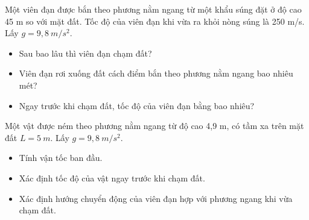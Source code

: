 \begin{vidu}%
Một viên đạn được bắn theo phương nằm ngang từ một khẩu súng đặt ở độ cao 45 m so với mặt đất. Tốc độ của viên đạn khi vừa ra khỏi nòng súng là 250 m/s. Lấy $g=9,8\ m/s^2$.
\begin{itemize}
\item[a)] Sau bao lâu thì viên đạn chạm đất? 
\item[b)] Viên đạn rơi xuống đất cách điểm bắn theo phương nằm ngang bao nhiêu mét?
\item[c)] Ngay trước khi chạm đất, tốc độ của viên đạn bằng bao nhiêu?
\end{itemize}
\end{vidu}	
\begin{vidu}%
Một vật được ném theo phương nằm ngang từ độ cao 4,9 m, có tầm xa trên mặt đất $L=5\ m$. Lấy $g=9,8\ m/s^2$.
\begin{itemize}
\item[a)] Tính vận tốc ban đầu.
\item[b)] Xác định tốc độ của vật ngay trước khi chạm đất. 
\item[c)] Xác định hướng chuyển động của viên đạn hợp với phương ngang khi vừa chạm đất.
\end{itemize}
\end{vidu}	

